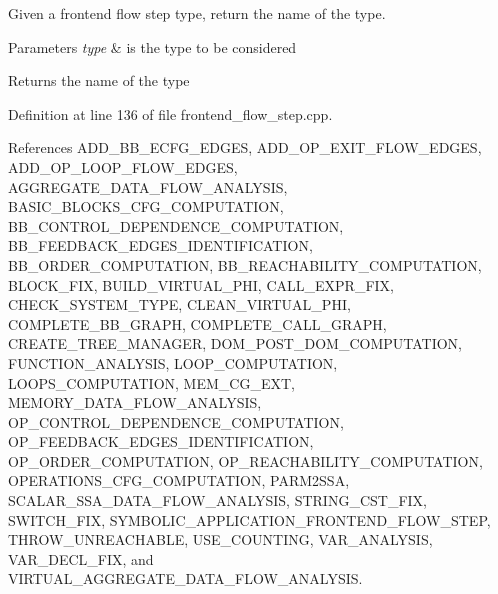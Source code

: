 Given a frontend flow step type, return the name of the type. 


\begin{DoxyParams}{Parameters}
{\em type} & is the type to be considered \\
\hline
\end{DoxyParams}
\begin{DoxyReturn}{Returns}
the name of the type 
\end{DoxyReturn}


Definition at line 136 of file frontend\+\_\+flow\+\_\+step.\+cpp.



References A\+D\+D\+\_\+\+B\+B\+\_\+\+E\+C\+F\+G\+\_\+\+E\+D\+G\+ES, A\+D\+D\+\_\+\+O\+P\+\_\+\+E\+X\+I\+T\+\_\+\+F\+L\+O\+W\+\_\+\+E\+D\+G\+ES, A\+D\+D\+\_\+\+O\+P\+\_\+\+L\+O\+O\+P\+\_\+\+F\+L\+O\+W\+\_\+\+E\+D\+G\+ES, A\+G\+G\+R\+E\+G\+A\+T\+E\+\_\+\+D\+A\+T\+A\+\_\+\+F\+L\+O\+W\+\_\+\+A\+N\+A\+L\+Y\+S\+IS, B\+A\+S\+I\+C\+\_\+\+B\+L\+O\+C\+K\+S\+\_\+\+C\+F\+G\+\_\+\+C\+O\+M\+P\+U\+T\+A\+T\+I\+ON, B\+B\+\_\+\+C\+O\+N\+T\+R\+O\+L\+\_\+\+D\+E\+P\+E\+N\+D\+E\+N\+C\+E\+\_\+\+C\+O\+M\+P\+U\+T\+A\+T\+I\+ON, B\+B\+\_\+\+F\+E\+E\+D\+B\+A\+C\+K\+\_\+\+E\+D\+G\+E\+S\+\_\+\+I\+D\+E\+N\+T\+I\+F\+I\+C\+A\+T\+I\+ON, B\+B\+\_\+\+O\+R\+D\+E\+R\+\_\+\+C\+O\+M\+P\+U\+T\+A\+T\+I\+ON, B\+B\+\_\+\+R\+E\+A\+C\+H\+A\+B\+I\+L\+I\+T\+Y\+\_\+\+C\+O\+M\+P\+U\+T\+A\+T\+I\+ON, B\+L\+O\+C\+K\+\_\+\+F\+IX, B\+U\+I\+L\+D\+\_\+\+V\+I\+R\+T\+U\+A\+L\+\_\+\+P\+HI, C\+A\+L\+L\+\_\+\+E\+X\+P\+R\+\_\+\+F\+IX, C\+H\+E\+C\+K\+\_\+\+S\+Y\+S\+T\+E\+M\+\_\+\+T\+Y\+PE, C\+L\+E\+A\+N\+\_\+\+V\+I\+R\+T\+U\+A\+L\+\_\+\+P\+HI, C\+O\+M\+P\+L\+E\+T\+E\+\_\+\+B\+B\+\_\+\+G\+R\+A\+PH, C\+O\+M\+P\+L\+E\+T\+E\+\_\+\+C\+A\+L\+L\+\_\+\+G\+R\+A\+PH, C\+R\+E\+A\+T\+E\+\_\+\+T\+R\+E\+E\+\_\+\+M\+A\+N\+A\+G\+ER, D\+O\+M\+\_\+\+P\+O\+S\+T\+\_\+\+D\+O\+M\+\_\+\+C\+O\+M\+P\+U\+T\+A\+T\+I\+ON, F\+U\+N\+C\+T\+I\+O\+N\+\_\+\+A\+N\+A\+L\+Y\+S\+IS, L\+O\+O\+P\+\_\+\+C\+O\+M\+P\+U\+T\+A\+T\+I\+ON, L\+O\+O\+P\+S\+\_\+\+C\+O\+M\+P\+U\+T\+A\+T\+I\+ON, M\+E\+M\+\_\+\+C\+G\+\_\+\+E\+XT, M\+E\+M\+O\+R\+Y\+\_\+\+D\+A\+T\+A\+\_\+\+F\+L\+O\+W\+\_\+\+A\+N\+A\+L\+Y\+S\+IS, O\+P\+\_\+\+C\+O\+N\+T\+R\+O\+L\+\_\+\+D\+E\+P\+E\+N\+D\+E\+N\+C\+E\+\_\+\+C\+O\+M\+P\+U\+T\+A\+T\+I\+ON, O\+P\+\_\+\+F\+E\+E\+D\+B\+A\+C\+K\+\_\+\+E\+D\+G\+E\+S\+\_\+\+I\+D\+E\+N\+T\+I\+F\+I\+C\+A\+T\+I\+ON, O\+P\+\_\+\+O\+R\+D\+E\+R\+\_\+\+C\+O\+M\+P\+U\+T\+A\+T\+I\+ON, O\+P\+\_\+\+R\+E\+A\+C\+H\+A\+B\+I\+L\+I\+T\+Y\+\_\+\+C\+O\+M\+P\+U\+T\+A\+T\+I\+ON, O\+P\+E\+R\+A\+T\+I\+O\+N\+S\+\_\+\+C\+F\+G\+\_\+\+C\+O\+M\+P\+U\+T\+A\+T\+I\+ON, P\+A\+R\+M2\+S\+SA, S\+C\+A\+L\+A\+R\+\_\+\+S\+S\+A\+\_\+\+D\+A\+T\+A\+\_\+\+F\+L\+O\+W\+\_\+\+A\+N\+A\+L\+Y\+S\+IS, S\+T\+R\+I\+N\+G\+\_\+\+C\+S\+T\+\_\+\+F\+IX, S\+W\+I\+T\+C\+H\+\_\+\+F\+IX, S\+Y\+M\+B\+O\+L\+I\+C\+\_\+\+A\+P\+P\+L\+I\+C\+A\+T\+I\+O\+N\+\_\+\+F\+R\+O\+N\+T\+E\+N\+D\+\_\+\+F\+L\+O\+W\+\_\+\+S\+T\+EP, T\+H\+R\+O\+W\+\_\+\+U\+N\+R\+E\+A\+C\+H\+A\+B\+LE, U\+S\+E\+\_\+\+C\+O\+U\+N\+T\+I\+NG, V\+A\+R\+\_\+\+A\+N\+A\+L\+Y\+S\+IS, V\+A\+R\+\_\+\+D\+E\+C\+L\+\_\+\+F\+IX, and V\+I\+R\+T\+U\+A\+L\+\_\+\+A\+G\+G\+R\+E\+G\+A\+T\+E\+\_\+\+D\+A\+T\+A\+\_\+\+F\+L\+O\+W\+\_\+\+A\+N\+A\+L\+Y\+S\+IS.



